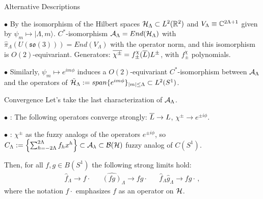 \begin{frame}{Alternative Descriptions} %

     $\bullet$ By the isomorphism of the Hilbert spaces $\mathcal H_\Lambda \subset L^2(\mathbb R^2)$ and $V_\Lambda \equiv \mathbb C^{2\Lambda + 1}$ given by $\psi_m \mapsto |\Lambda, m\rangle$. \Then $C^*$-isomorphism $\mathcal A_\Lambda = End(\mathcal H_\Lambda)$ with $\hat \pi_\Lambda(U(\mathfrak{so}(3))) = End(V_\Lambda)$ with the operator norm, and this isomorphism is $O(2)$-equivariant. Generators: $\overline{\chi^\pm} = f^\chi_{\pm}(\overline{L}) L^\pm$, with $f^\chi_\pm$ polynomials.
     
     $\bullet$ Similarly, $\psi_m \mapsto e^{im\phi}$ induces a $O(2)$-equivariant $C^*$-isomorphism between $\mathcal A_\Lambda$ and the operators of $\tilde {\mathcal H}_\Lambda := span\{e^{im\phi}\}_{|m| \leq \Lambda} \subset L^2(S^1) $.



    
\end{frame}

\begin{frame}{Convergence} %
    Let's take the last characterization of $\mathcal A_\Lambda$.

    
    $\bullet$ : The following operators converge strongly: $\overline{L} \to L$, $\chi^\pm \to e^{\pm i\phi}$.
    
    $\bullet$ : $\chi^\pm$ as the fuzzy analogs of the operators $e^{\pm i\phi}$, so $C_\Lambda := \left\{ \sum_{h = -2\Lambda}^{2\Lambda} f_h x^h \right\} \subset \mathcal A_\lambda \subset \mathcal B(\mathcal H)$ fuzzy analog of $C(S^1)$.  
    
    Then, for all $f, g \in B(S^1)$ the following strong limits hold:
\begin{align}
    \hat f_\Lambda \to f\cdot && \hat{(fg)}_\Lambda \to fg\cdot && \hat f_\Lambda \hat g_\Lambda \to fg \cdot\,,
\end{align}
where the notation $f\cdot$ emphasizes $f$ as an operator on $\mathcal H$.
\end{frame}

